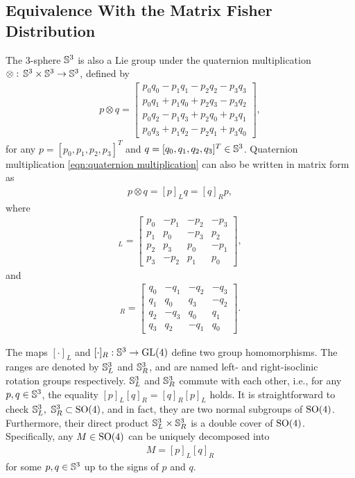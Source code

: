 \subsection{Equivalence With the Matrix Fisher Distribution}

The 3-sphere $\mathbb{S}^3$ is also a Lie group under the quaternion multiplication $\otimes:\, \mathbb{S}^3\times \mathbb{S}^3 \to \mathbb{S}^3$, defined by
\begin{align} \label{eqn:quaternion multiplication}
	p \otimes q = \begin{bmatrix} p_0q_0 - p_1q_1 - p_2q_2 - p_3q_3 \\ p_0q_1 + p_1q_0 + p_2q_3 - p_3q_2 \\ p_0q_2 - p_1q_3 + p_2q_0 + p_3q_1 \\ p_0q_3 + p_1q_2 - p_2q_1 + p_3q_0 \end{bmatrix},
\end{align}
for any $p = [p_0,p_1,p_2,p_3]^T$ and $q = [q_0,q_1,q_2,q_3]^T \in\mathbb{S}^3$.
Quaternion multiplication \eqref{eqn:quaternion multiplication} can also be written in matrix form as
\begin{align}
	p\otimes q = [p]_Lq = [q]_Rp,
\end{align}
where
\begin{align}
	[p]_L = \begin{bmatrix} p_0 & -p_1 & -p_2 & -p_3 \\ p_1 & p_0 & -p_3 & p_2 \\ p_2 & p_3 & p_0 & -p_1 \\ p_3 & -p_2 & p_1 & p_0 \end{bmatrix},
\end{align}
and
\begin{align}
	[q]_R = \begin{bmatrix} q_0 & -q_1 & -q_2 & -q_3 \\ q_1 & q_0 & q_3 & -q_2 \\ q_2 & -q_3 & q_0 & q_1 \\ q_3 & q_2 & -q_1 & q_0 \end{bmatrix}.
\end{align}

The maps $[\cdot]_L$ and $[\cdot]_R: \mathbb{S}^3 \to \mathrm{GL}(4)$ define two group homomorphisms.
The ranges are denoted by $\mathbb{S}^3_L$ and $\mathbb{S}^3_R$, and are named left- and right-isoclinic rotation groups respectively.
$\mathbb{S}^3_L$ and $\mathbb{S}^3_R$ commute with each other, i.e., for any $p,q\in\mathbb{S}^3$, the equality $[p]_L[q]_R = [q]_R[p]_L$ holds.
It is straightforward to check $\mathbb{S}^3_L,\ \mathbb{S}^3_R \subset \mathrm{SO}(4)$, and in fact, they are two normal subgroups of $\mathrm{SO}(4)$.
Furthermore, their direct product $\mathbb{S}^3_L \times \mathbb{S}^3_R$ is a double cover of $\mathrm{SO}(4)$.
Specifically, any $M\in\mathrm{SO}(4)$ can be uniquely decomposed into
\begin{align}
	M = [p]_L[q]_R
\end{align}
for some $p,q\in\mathbb{S}^3$ up to the signs of $p$ and $q$.

